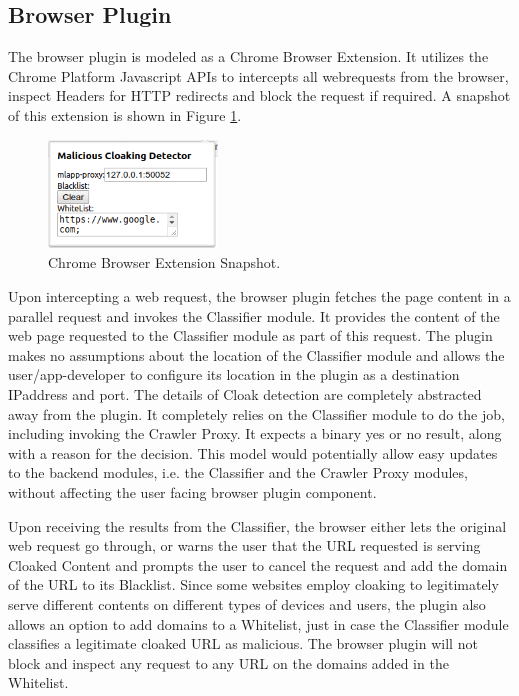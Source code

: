 \documentclass[letterpaper,twocolumn,10pt]{article}
\begin{document}
\subsection{Browser Plugin}

The browser plugin is modeled as a Chrome Browser Extension. It utilizes the Chrome Platform Javascript APIs to intercepts all webrequests from the browser, inspect Headers for HTTP redirects and block the request if required. A snapshot of this extension is shown in Figure \ref{fig:plugin}.\\

\begin{figure}[t]
  \centering
  \includegraphics[width=0.4\textwidth]{./proj_plugin.png}
  \caption{Chrome Browser Extension Snapshot.}
  \label{fig:plugin}
\end{figure}

Upon intercepting a web request, the browser plugin fetches the page content in a parallel request and invokes the Classifier module. It provides the content of the web page requested to the Classifier module as part of this request. The plugin makes no assumptions about the location of the Classifier module and allows the user/app-developer to configure its location in the plugin as a destination IPaddress and port. The details of Cloak detection are completely abstracted away from the plugin. It completely relies on the Classifier module to do the job, including invoking the Crawler Proxy. It expects a binary yes or no result, along with a reason for the decision. This model would potentially allow easy updates to the backend modules, i.e. the Classifier and the Crawler Proxy modules, without affecting the user facing browser plugin component.

Upon receiving the results from the Classifier, the browser either lets the original web request go through, or warns the user that the URL requested is serving Cloaked Content and prompts the user to cancel the request and add the domain of the URL to its Blacklist. Since some websites employ cloaking to legitimately serve different contents on different types of devices and users, the plugin also allows an option to add domains to a Whitelist, just in case the Classifier module classifies a legitimate cloaked URL as malicious. The browser plugin will not block and inspect any request to any URL on the domains added in the Whitelist.
\end{document}
